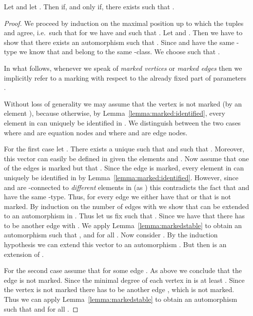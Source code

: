 \documentclass[a4paper,UKenglish]{lipics}
\theoremstyle{plain}
\begin{document}
\begin{lemma}\label{lemma:slvclass:orbit:ckeqv}
 Let  and let .
 Then  if, and only if, there exists 
 such that .
\end{lemma}
\begin{proof}
We proceed by induction on the maximal position  up to 
which the tuples  and  agree, i.e.\ such that for  we 
have  and such that .
Let  and . 
Then we have to show that there exists an automorphism 
 such that 
.
Since  and  have the same -type we know that 
 and  belong to the same -class. 
We choose  such that . 

In what follows, whenever we speak of \emph{marked vertices} or 
\emph{marked edges} then we implicitly refer to a marking with respect to 
the already fixed part of parameters .

Without loss of generality we may assume that the vertex  is not 
marked (by an element ), because otherwise, by 
Lemma~\ref{lemma:marked:identified}, every element in  can 
uniquely be identified in .
We distinguish between the two cases where  and  are equation nodes 
and where  and  are edge nodes.

For the first case let .
There exists a unique  such that 
 and such that .
Moreover, this vector  can easily be defined in 
 given the elements  and . 
Now assume that one of the edges  is marked but that 
. 
Since the edge  is marked, every element in  can uniquely be 
identified in  
by Lemma~\ref{lemma:marked:identified}.
However, since  and  are -connected to \emph{different} elements 
in  (as ) this 
contradicts the fact that  and  have the same -type.
Thus, for every edge  we either have that  or that  
is not marked. By induction on the number of edges  with 
 we show that  can be extended to an 
automorphism in .
Thus let us fix  such that . Since we have 
that  there has to be another edge  with . We apply 
Lemma~\ref{lemma:markedstable}
to obtain an automorphism  such 
that 
,  and  for all .
Now consider . By the 
induction 
hypothesis we can extend this vector to an automorphism 
. But then  is an extension of .

For the second case assume that  for some edge .
As above we conclude that the edge  is not marked.
Since  the minimal degree of each 
vertex in  is at least . 
Since the vertex  is not marked there has to be 
another edge ,  which is not marked.
Thus we can apply 
Lemma~\ref{lemma:markedstable}
to obtain an automorphism  
such that  and  for all . 
\end{proof}
\end{document}
